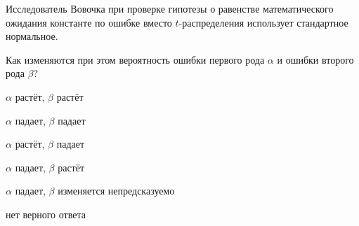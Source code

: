 
\begin{question}
Исследователь Вовочка при проверке гипотезы о равенстве математического
ожидания константе по ошибке вместо \(t\)-распределения использует
стандартное нормальное.

Как изменяются при этом вероятность ошибки первого рода \(\alpha\) и
ошибки второго рода \(\beta\)?
\begin{answerlist}
  \item \(\alpha\) растёт, \(\beta\) растёт
  \item \(\alpha\) падает, \(\beta\) падает
  \item \(\alpha\) растёт, \(\beta\) падает
  \item \(\alpha\) падает, \(\beta\) растёт
  \item \(\alpha\) падает, \(\beta\) изменяется непредсказуемо
  \item нет верного ответа
\end{answerlist}
\end{question}


